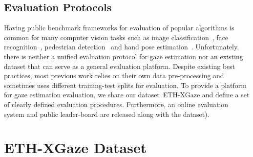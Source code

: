 \documentclass[runningheads]{llncs}
\newcommand{\datasetname}{ETH-XGaze\xspace}
\begin{document}
\subsection{Evaluation Protocols}
Having public benchmark frameworks for evaluation of popular algorithms is common for many computer vision tasks such as image classification~\cite{russakovsky2015imagenet}, face recognition~\cite{kemelmacher2016megaface}, pedestrian detection~\cite{dollar2011pedestrian} and hand pose estimation~\cite{zimmermann2019freihand}.
Unfortunately, there is neither a unified evaluation protocol for gaze estimation nor an existing dataset that can serve as a general evaluation platform.
Despite existing best practices, most previous work relies on their own data pre-processing and sometimes uses different training-test splits for evaluation. 
To provide a platform for gaze estimation evaluation, we share our dataset~\datasetname and define a set of clearly defined evaluation procedures. Furthermore, an online evaluation system and public leader-board are released along with the dataset).  
\section{\datasetname Dataset}
\end{document}
